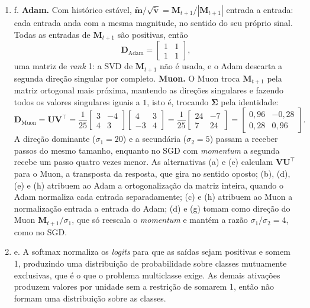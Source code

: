 \documentclass{dlproblemset}
\begin{document}
\begin{enumerate}[1)]
    \item f. \textbf{Adam.} Com histórico estável, $\widetilde{\mathbf{m}}/\sqrt{\widetilde{\mathbf{v}}} = \mathbf{M}_{t+1}/|\mathbf{M}_{t+1}|$ entrada a entrada: cada entrada anda com a mesma magnitude, no sentido do seu próprio sinal. Todas as entradas de $\mathbf{M}_{t+1}$ são positivas, então
    \[
    \mathbf{D}_{\text{Adam}} = \begin{bmatrix} 1 & 1 \\ 1 & 1 \end{bmatrix},
    \]
    uma matriz de \textit{rank} 1: a SVD de $\mathbf{M}_{t+1}$ não é usada, e o Adam descarta a segunda direção singular por completo. \textbf{Muon.} O Muon troca $\mathbf{M}_{t+1}$ pela matriz ortogonal mais próxima, mantendo as direções singulares e fazendo todos os valores singulares iguais a $1$, isto é, trocando $\boldsymbol{\Sigma}$ pela identidade:
    \[
    \mathbf{D}_{\text{Muon}} = \mathbf{U}\mathbf{V}^{\top}
    = \frac{1}{25}\begin{bmatrix} 3 & -4 \\ 4 & 3 \end{bmatrix}\begin{bmatrix} 4 & 3 \\ -3 & 4 \end{bmatrix}
    = \frac{1}{25}\begin{bmatrix} 24 & -7 \\ 7 & 24 \end{bmatrix}
    = \begin{bmatrix} 0{,}96 & -0{,}28 \\ 0{,}28 & 0{,}96 \end{bmatrix}.
    \]
    A direção dominante ($\sigma_1 = 20$) e a secundária ($\sigma_2 = 5$) passam a receber passos do mesmo tamanho, enquanto no SGD com \textit{momentum} a segunda recebe um passo quatro vezes menor. As alternativas (a) e (e) calculam $\mathbf{V}\mathbf{U}^{\top}$ para o Muon, a transposta da resposta, que gira no sentido oposto; (b), (d), (e) e (h) atribuem ao Adam a ortogonalização da matriz inteira, quando o Adam normaliza cada entrada separadamente; (c) e (h) atribuem ao Muon a normalização entrada a entrada do Adam; (d) e (g) tomam como direção do Muon $\mathbf{M}_{t+1}/\sigma_1$, que só reescala o \textit{momentum} e mantém a razão $\sigma_1/\sigma_2 = 4$, como no SGD.

    \item e. A softmax normaliza os \textit{logits} para que as saídas sejam positivas e somem 1, produzindo uma distribuição de probabilidade sobre classes mutuamente exclusivas, que é o que o problema multiclasse exige. As demais ativações produzem valores por unidade sem a restrição de somarem 1, então não formam uma distribuição sobre as classes.


\end{enumerate}
\end{document}
